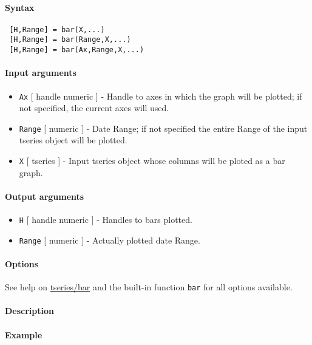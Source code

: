 


	\paragraph{Syntax}
 
 \begin{verbatim}
 [H,Range] = bar(X,...)
 [H,Range] = bar(Range,X,...)
 [H,Range] = bar(Ax,Range,X,...)
 \end{verbatim}
 
 \paragraph{Input arguments}
 
 \begin{itemize}
 \item
   \texttt{Ax} {[} handle \textbar{} numeric {]} - Handle to axes in
   which the graph will be plotted; if not specified, the current axes
   will used.
 \item
   \texttt{Range} {[} numeric {]} - Date Range; if not specified the
   entire Range of the input tseries object will be plotted.
 \item
   \texttt{X} {[} tseries {]} - Input tseries object whose columns will
   be ploted as a bar graph.
 \end{itemize}
 
 \paragraph{Output arguments}
 
 \begin{itemize}
 \item
   \texttt{H} {[} handle \textbar{} numeric {]} - Handles to bars
   plotted.
 \item
   \texttt{Range} {[} numeric {]} - Actually plotted date Range.
 \end{itemize}
 
 \paragraph{Options}
 
 See help on \url{tseries/bar} and the built-in function \texttt{bar} for
 all options available.
 
 \paragraph{Description}
 
 \paragraph{Example}



